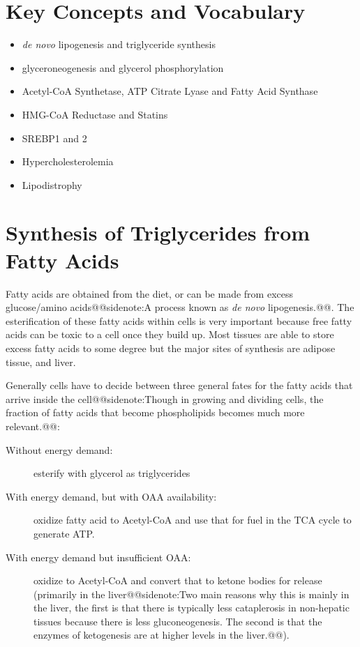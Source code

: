 \documentclass{tufte-handout}
\makeatletter
\def\sidenote#1{@@sidenote:#1@@}
\makeatother
\begin{document}
\section{Key Concepts and Vocabulary}
\begin{itemize}
\item \textit{de novo} lipogenesis and triglyceride synthesis
\item glyceroneogenesis and glycerol phosphorylation
\item Acetyl-CoA Synthetase, ATP Citrate Lyase and Fatty Acid Synthase
\item HMG-CoA Reductase and Statins
\item SREBP1 and 2
\item Hypercholesterolemia
\item Lipodistrophy

\end{itemize}

\section{Synthesis of Triglycerides from Fatty Acids}

Fatty acids are obtained from the diet, or can be made from excess glucose/amino acids\sidenote{A process known as \textit{de novo} lipogenesis.}.  The esterification of these fatty acids within cells is very important because free fatty acids can be toxic to a cell once they build up.  Most tissues are able to store excess fatty acids to some degree but the major sites of synthesis are adipose tissue, and liver.

Generally cells have to decide between three general fates for the fatty acids that arrive inside the cell\sidenote{Though in growing and dividing cells, the fraction of fatty acids that become phospholipids becomes much more relevant.}:
\begin{description}
\item [Without energy demand:] esterify with glycerol as triglycerides
\item [With energy demand, but with OAA availability:] oxidize fatty acid to Acetyl-CoA and use that for fuel in the TCA cycle to generate ATP.
\item [With energy demand but insufficient OAA:] oxidize to Acetyl-CoA and convert that to ketone bodies for release (primarily in the liver\sidenote{Two main reasons why this is mainly in the liver, the first is that there is typically less cataplerosis in non-hepatic tissues because there is less gluconeogenesis.  The second is that the enzymes of ketogenesis are at higher levels in the liver.}).
\end{description}
\end{document}
